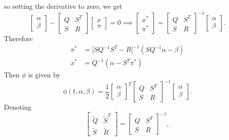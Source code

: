 so setting the derivative to zero, we get
\begin{equation*}
    \begin{bmatrix}
        \alpha\\
        \beta
    \end{bmatrix} - 
    \begin{bmatrix}
        Q & S^T\\
        S & R
    \end{bmatrix}
    \begin{bmatrix}
        x\\
        \pi
    \end{bmatrix}
    = 0 \implies 
    \begin{bmatrix}
        x^\ast\\
        \pi^\ast
    \end{bmatrix} = 
    \begin{bmatrix}
        Q & S^T\\
        S & R
    \end{bmatrix}^{-1}
    \begin{bmatrix}
        \alpha\\
        \beta
    \end{bmatrix}.
\end{equation*}
Therefore
\begin{align*}
    \pi^\ast &= \big[ S Q^{-1}S^T - R \big]^{-1}(S Q^{-1} \alpha - \beta)\\
    x^\ast &= Q^{-1} (\alpha - S^T \pi^\ast)
\end{align*}
Then $\phi$ is given by
\begin{equation*}
    \phi(t, \alpha, \beta) = 
    \frac12
    \begin{bmatrix}
        \alpha\\
        \beta
    \end{bmatrix}^T
    \begin{bmatrix}
        Q & S^T\\
        S & R
    \end{bmatrix}^{-1}
    \begin{bmatrix}
        \alpha\\
        \beta
    \end{bmatrix}. 
\end{equation*}
Denoting
\begin{equation*}\begin{bmatrix}
        \tilde{Q} & \tilde{S}^T\\
        \tilde{S} & \tilde{R}
    \end{bmatrix}
    =
    \begin{bmatrix}
        Q & S^T\\
        S & R
    \end{bmatrix}^{-1},
\end{equation*}
